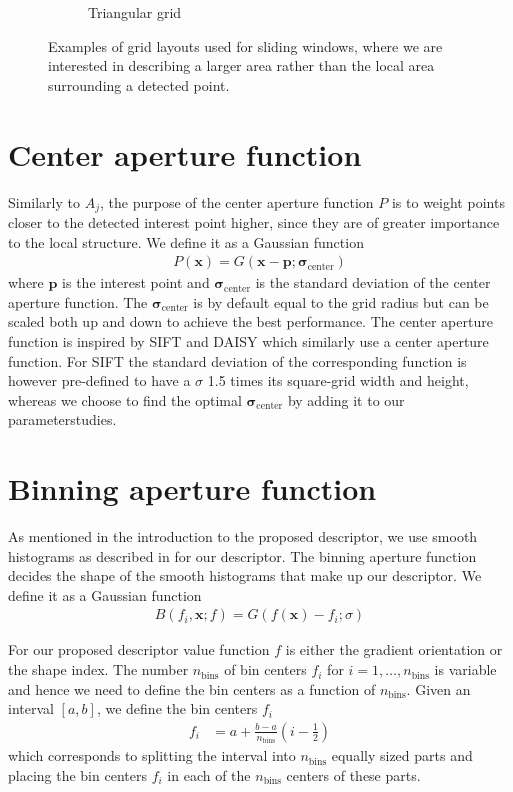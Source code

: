 \documentclass[thesis.tex]{subfiles}
\def\x{\mathbf{x}}
\def\p{\mathbf{p}}
\def\sigmacenter{\boldsymbol{\sigma}_\text{center}}
\begin{document}
\begin{figure}
\begin{subfigure}[t]{0.45\textwidth}
		\caption{Triangular grid}
		\label{fig:gridTypeTriangle}
	\end{subfigure}
	\caption{Examples of grid layouts used for sliding windows, where we are interested in describing a larger area rather than the local area surrounding a detected point.}
\label{fig:gridTypeWindow}
\end{figure}
%
\section{Center aperture function}
\label{sec:centerApertureFunction}
%
Similarly to $A_j$, the purpose of the center aperture function $P$ is to weight points closer to the detected interest point higher, since they are of greater importance to the local structure. We define it as a Gaussian function
%
\begin{align}
P(\x) = G(\x - \p; \sigmacenter)
\end{align}
%
where $\p$ is the interest point and $\sigmacenter$ is the standard deviation of the center aperture function. The $\sigmacenter$ is by default equal to the grid radius but can be scaled both up and down to achieve the best performance. The center aperture function is inspired by SIFT \cite{lowe2004distinctive} and DAISY \cite{tola2008fast} which similarly use a center aperture function. For SIFT the standard deviation of the corresponding function is however pre-defined to have a $\sigma$ 1.5 times its square-grid width and height, whereas we choose to find the optimal $\sigmacenter$ by adding it to our parameterstudies.
%
\section{Binning aperture function}
%
As mentioned in the introduction to the proposed descriptor, we use smooth histograms as described in  for our descriptor. The binning aperture function decides the shape of the smooth histograms that make up our descriptor. We define it as a Gaussian function
\begin{align}
	B(f_i, \x; f) = G(f(\x) - f_i; \sigma)
\end{align}

For our proposed descriptor value function $f$ is either the gradient orientation or the shape index. The number $n_\text{bins}$ of bin centers $f_i$ for $i = 1,\hdots,n_\text{bins}$ is variable and hence we need to define the bin centers as a function of $n_\text{bins}$. Given an interval $[a,b]$, we define the bin centers $f_i$
\begin{align}
	\label{eq:binCenters}
	f_i &= a + \frac{b-a}{n_\text{bins}} \left(i - \frac{1}{2} \right)
\end{align}
which corresponds to splitting the interval into $n_\text{bins}$ equally sized parts and placing the bin centers $f_i$ in each of the $n_\text{bins}$ centers of these parts.
\end{document}
